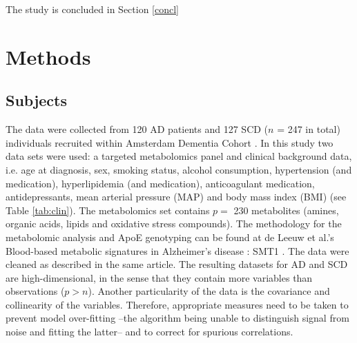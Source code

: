 \documentclass{amsart}
\begin{document}
The study is concluded in Section \ref{concl}


\newpage
\section{Methods}\label{methods}

\subsection{Subjects}\label{subjects}
The data were collected from 120 AD patients and 127 SCD ($n$ = 247 in total) individuals recruited within Amsterdam Dementia Cohort \cite{VanDerFlier2018AmsterdamCare, deLeeuw2017Blood-basedDisease}. In this study two data sets were used: a targeted metabolomics panel and clinical background data, i.e. age at diagnosis, sex, smoking status, alcohol consumption, hypertension (and medication), hyperlipidemia (and medication), anticoagulant medication, antidepressants, mean arterial pressure (MAP) and body mass index (BMI) (see Table \ref{tab:clin}). The metabolomics set contains $p =$ 230 metabolites (amines, organic acids, lipids and oxidative stress compounds). The methodology for the metabolomic analysis and ApoE genotyping can be found at de Leeuw et al.'s  Blood-based metabolic signatures in Alzheimer's disease \cite{deLeeuw2017Blood-basedDisease}: SMT1 . The data were cleaned as described in the same article. The resulting datasets for AD and SCD are high-dimensional, in the sense that they contain more variables than observations ($p > n$). Another particularity of the data is the covariance and collinearity of the variables. Therefore, appropriate measures need to be taken to prevent model over-fitting --the algorithm being unable to distinguish signal from noise and fitting the latter--  and to correct for spurious correlations.
\end{document}
